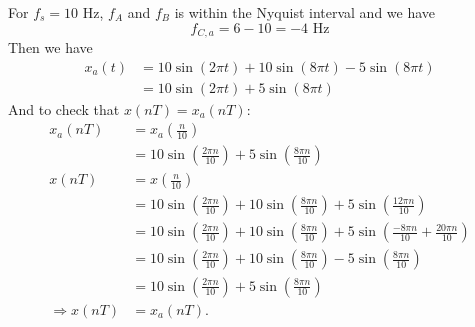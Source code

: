 \begin{itemize}
For $f_s = 10$ Hz, $f_A$ and $f_B$ is within the Nyquist interval and we
have
\begin{equation*}
	f_{C,a} = 6 - 10 = -4 \text{ Hz}
\end{equation*}
Then we have
\begin{align*}
	x_a(t) &= 10\sin(2\pi t) + 10\sin(8\pi t) - 5\sin(8\pi t) \\
		   &= 10\sin(2\pi t) + 5\sin(8\pi t)
\end{align*}
And to check that $x(nT) = x_a(nT)$:
\begin{align*}
	x_a(nT) &= x_a\left(\frac{n}{10}\right) \\
			&= 10\sin\left(\frac{2\pi n}{10}\right) + 5\sin\left(\frac{8\pi n}{10}\right) \\
	x(nT) 	&= x\left(\frac{n}{10}\right) \\
			&= 10\sin\left(\frac{2\pi n}{10}\right) + 10\sin\left(\frac{8\pi n}{10}\right) + 5\sin\left(\frac{12\pi n}{10}\right) \\
			&= 10\sin\left(\frac{2\pi n}{10}\right) + 10\sin\left(\frac{8\pi n}{10}\right) + 5\sin\left(\frac{-8\pi n}{10} + \frac{20\pi n}{10}\right) \\
			&= 10\sin\left(\frac{2\pi n}{10}\right) + 10\sin\left(\frac{8\pi n}{10}\right) - 5\sin\left(\frac{8\pi n}{10}\right) \\
			&= 10\sin\left(\frac{2\pi n}{10}\right) + 5\sin\left(\frac{8\pi n}{10}\right) \\
	\Rightarrow x(nT) &= x_a(nT)\text{.}
\end{align*}






\end{itemize}
